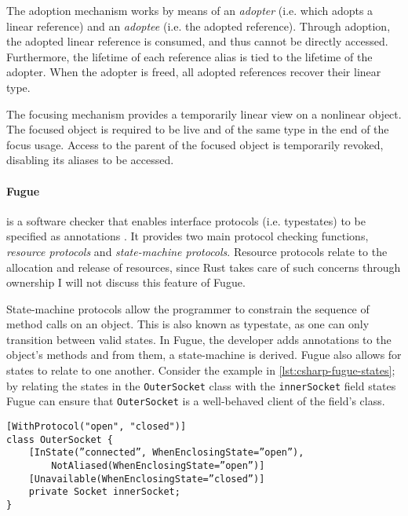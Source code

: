 The adoption mechanism works by means of an \emph{adopter} (i.e. which adopts a linear reference) and an \emph{adoptee} (i.e. the adopted reference).
Through adoption, the adopted linear reference is consumed, and thus cannot be directly accessed.
Furthermore, the lifetime of each reference alias is tied to the lifetime of the adopter.
When the adopter is freed, all adopted references recover their linear type.

The focusing mechanism provides a temporarily linear view on a nonlinear object.
The focused object is required to be live and of the same type in the end of the focus usage.
Access to the parent of the focused object is temporarily revoked, disabling its aliases to be accessed.

\paragraph{Fugue} is a software checker that enables interface protocols (i.e. typestates) to be specified as annotations \autocite{DeLine2004}.
It provides two main protocol checking functions, \emph{resource protocols} and \emph{state-machine protocols}.
Resource protocols relate to the allocation and release of resources,
since Rust takes care of such concerns through ownership I will not discuss this feature of Fugue.

State-machine protocols allow the programmer to constrain the sequence of method calls on an object.
This is also known as typestate, as one can only transition between valid states.
In Fugue, the developer adds annotations to the object's methods and from them, a state-machine is derived.
Fugue also allows for states to relate to one another.
Consider the example in \autoref{lst:csharp-fugue-states}; by relating the states in the \texttt{OuterSocket} class
with the \texttt{innerSocket} field states Fugue can ensure that \texttt{OuterSocket} is a well-behaved client of the field's class.

\begin{listing}
    \centering
    \begin{verbatim}
[WithProtocol("open", "closed")]
class OuterSocket {
    [InState(”connected”, WhenEnclosingState=”open”),
        NotAliased(WhenEnclosingState=”open”)]
    [Unavailable(WhenEnclosingState=”closed”)]
    private Socket innerSocket;
}
    \end{verbatim}
    \caption{
        Relating a class's states with the \texttt{innerSocket} states.
        In this example, the \texttt{OuterSocket}'s \texttt{open} state is related with the \texttt{connected} state of the socket.
        This ensures that the \texttt{OuterSocket} is a well-behaved client of \texttt{innerSocket}.
    }
    \label{lst:csharp-fugue-states}
\end{listing}

